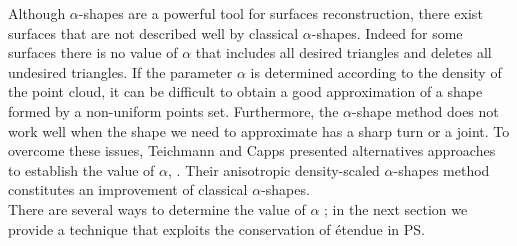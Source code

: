 \indent Although $\alpha$-shapes are a powerful tool for surfaces reconstruction, there exist surfaces that are not described well by classical $ \alpha $-shapes. Indeed for some surfaces there is no value of $\alpha$ that includes all desired triangles and deletes all undesired triangles. If the parameter $\alpha$ is determined according to the density of the point cloud, it can be difficult to obtain a good approximation of a shape formed by a non-uniform points set. Furthermore, the $\alpha$-shape method does not work well when the shape we need to approximate has a sharp turn or a joint. 
To overcome these issues, Teichmann and Capps presented alternatives approaches to establish the value of $\alpha$, \cite{teichmann1998surface}. Their anisotropic density-scaled $\alpha$-shapes method constitutes an improvement of  classical $\alpha$-shapes.
\\ \indent There are several ways to determine the value of $\alpha$ \cite{mandal1997selection}; in the next section we provide a technique that exploits the conservation of \'{e}tendue in PS. 
